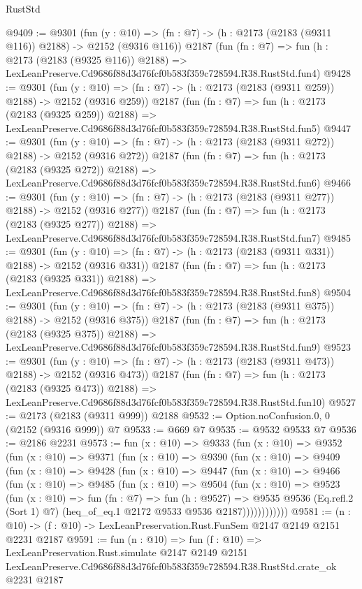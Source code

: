 \begin{lexlean}{RustStd}
\begin{coremodule}
@9409 := @9301
    (fun (y : @10) => (fn : @7) -> (h : @2173 (@2183 (@9311 @116)) @2188) -> @2152 (@9316 @116))
    @2187
    (fun (fn : @7) =>
    fun (h : @2173 (@2183 (@9325 @116)) @2188) =>
    LexLeanPreserve.Cd9686f88d3d76fcf0b583f359c728594.R38.RustStd.fun4)
@9428 := @9301
    (fun (y : @10) => (fn : @7) -> (h : @2173 (@2183 (@9311 @259)) @2188) -> @2152 (@9316 @259))
    @2187
    (fun (fn : @7) =>
    fun (h : @2173 (@2183 (@9325 @259)) @2188) =>
    LexLeanPreserve.Cd9686f88d3d76fcf0b583f359c728594.R38.RustStd.fun5)
@9447 := @9301
    (fun (y : @10) => (fn : @7) -> (h : @2173 (@2183 (@9311 @272)) @2188) -> @2152 (@9316 @272))
    @2187
    (fun (fn : @7) =>
    fun (h : @2173 (@2183 (@9325 @272)) @2188) =>
    LexLeanPreserve.Cd9686f88d3d76fcf0b583f359c728594.R38.RustStd.fun6)
@9466 := @9301
    (fun (y : @10) => (fn : @7) -> (h : @2173 (@2183 (@9311 @277)) @2188) -> @2152 (@9316 @277))
    @2187
    (fun (fn : @7) =>
    fun (h : @2173 (@2183 (@9325 @277)) @2188) =>
    LexLeanPreserve.Cd9686f88d3d76fcf0b583f359c728594.R38.RustStd.fun7)
@9485 := @9301
    (fun (y : @10) => (fn : @7) -> (h : @2173 (@2183 (@9311 @331)) @2188) -> @2152 (@9316 @331))
    @2187
    (fun (fn : @7) =>
    fun (h : @2173 (@2183 (@9325 @331)) @2188) =>
    LexLeanPreserve.Cd9686f88d3d76fcf0b583f359c728594.R38.RustStd.fun8)
@9504 := @9301
    (fun (y : @10) => (fn : @7) -> (h : @2173 (@2183 (@9311 @375)) @2188) -> @2152 (@9316 @375))
    @2187
    (fun (fn : @7) =>
    fun (h : @2173 (@2183 (@9325 @375)) @2188) =>
    LexLeanPreserve.Cd9686f88d3d76fcf0b583f359c728594.R38.RustStd.fun9)
@9523 := @9301
    (fun (y : @10) => (fn : @7) -> (h : @2173 (@2183 (@9311 @473)) @2188) -> @2152 (@9316 @473))
    @2187
    (fun (fn : @7) =>
    fun (h : @2173 (@2183 (@9325 @473)) @2188) =>
    LexLeanPreserve.Cd9686f88d3d76fcf0b583f359c728594.R38.RustStd.fun10)
@9527 := @2173 (@2183 (@9311 @999)) @2188
@9532 := Option.noConfusion.{0, 0} (@2152 (@9316 @999)) @7
@9533 := @669 @7
@9535 := @9532 @9533 @7
@9536 := @2186 @2231
@9573 := fun (x : @10) =>
  @9333
    (fun (x : @10) =>
    @9352
      (fun (x : @10) =>
      @9371
        (fun (x : @10) =>
        @9390
          (fun (x : @10) =>
          @9409
            (fun (x : @10) =>
            @9428
              (fun (x : @10) =>
              @9447
                (fun (x : @10) =>
                @9466
                  (fun (x : @10) =>
                  @9485
                    (fun (x : @10) =>
                    @9504
                      (fun (x : @10) =>
                      @9523
                        (fun (x : @10) =>
                        fun (fn : @7) =>
                        fun (h : @9527) =>
                        @9535
                          @9536
                          (Eq.refl.{2} (Sort 1) @7)
                          (heq_of_eq.{1} @2172 @9533 @9536 @2187))))))))))))
@9581 := (n : @10) -> (f : @10) -> LexLeanPreservation.Rust.FunSem @2147 @2149 @2151 @2231 @2187
@9591 := fun (n : @10) =>
  fun (f : @10) =>
  LexLeanPreservation.Rust.simulate
    @2147
    @2149
    @2151
    LexLeanPreserve.Cd9686f88d3d76fcf0b583f359c728594.R38.RustStd.crate_ok
    @2231
    @2187
\end{coremodule}
\end{lexlean}
